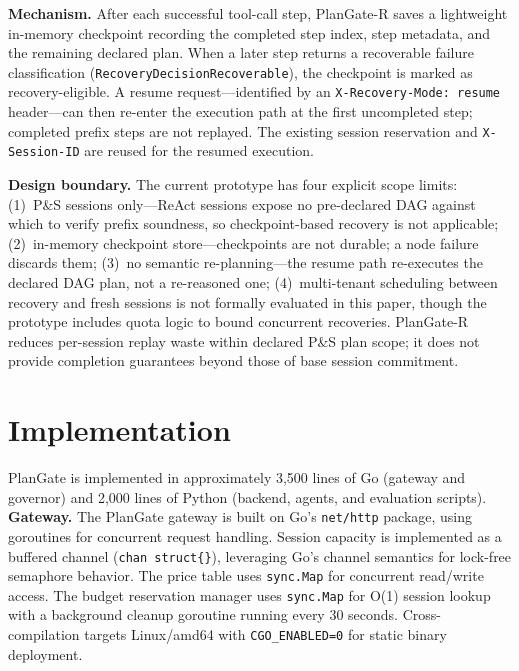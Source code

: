 \documentclass[sigconf,review,anonymous]{acmart}
\begin{document}
\textbf{Mechanism.}
After each successful tool-call step, PlanGate-R saves a lightweight in-memory checkpoint recording the completed step index, step metadata, and the remaining declared plan.
When a later step returns a recoverable failure classification (\texttt{RecoveryDecisionRecoverable}), the checkpoint is marked as recovery-eligible.
A resume request---identified by an \texttt{X-Recovery-Mode: resume} header---can then re-enter the execution path at the first uncompleted step; completed prefix steps are not replayed.
The existing session reservation and \texttt{X-Session-ID} are reused for the resumed execution.

\textbf{Design boundary.}
The current prototype has four explicit scope limits:
(1)~P\&S sessions only---ReAct sessions expose no pre-declared DAG against which to verify prefix soundness, so checkpoint-based recovery is not applicable;
(2)~in-memory checkpoint store---checkpoints are not durable; a node failure discards them;
(3)~no semantic re-planning---the resume path re-executes the declared DAG plan, not a re-reasoned one;
(4)~multi-tenant scheduling between recovery and fresh sessions is not formally evaluated in this paper, though the prototype includes quota logic to bound concurrent recoveries.
PlanGate-R reduces per-session replay waste within declared P\&S plan scope; it does not provide completion guarantees beyond those of base session commitment.

\section{Implementation}

PlanGate is implemented in approximately 3,500 lines of Go (gateway and governor) and 2,000 lines of Python (backend, agents, and evaluation scripts).
\textbf{Gateway.} The PlanGate gateway is built on Go's \texttt{net/http} package, using goroutines for concurrent request handling. Session capacity is implemented as a buffered channel (\texttt{chan struct\{\}}), leveraging Go's channel semantics for lock-free semaphore behavior. The price table uses \texttt{sync.Map} for concurrent read/write access. The budget reservation manager uses \texttt{sync.Map} for O(1) session lookup with a background cleanup goroutine running every 30 seconds. Cross-compilation targets Linux/amd64 with \texttt{CGO\_ENABLED=0} for static binary deployment.
\end{document}
